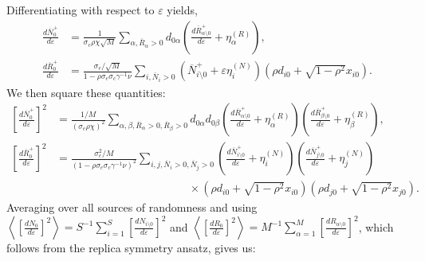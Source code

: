 \documentclass[10pt]{article}
\newcommand{\eval}[1]{\left\langle #1 \right\rangle}
\begin{document}
Differentiating with respect to $\varepsilon$ yields,
\begin{align}
	\frac{d\overline N_0^+}{d\varepsilon}
	&= 
	\frac{1}{ \sigma_e \rho \chi \sqrt{M}}
	\sum_{\alpha ,\overline R_\alpha>0} d_{0\alpha} \left(
		\frac{d\overline R_{\alpha \setminus 0}^+}{d\varepsilon}
		+
		\eta_{\alpha}^{(R)}
	\right),
	\\
	\frac{d\overline R_0^+}{d\varepsilon}
	&=
	\frac{{\sigma_e}/{\sqrt{M}}}{1
	-
	\rho \sigma_e \sigma_c \gamma^{-1} \nu }
	\sum_{i,\overline N_i>0}
	\left(
		\overline N_{i \setminus 0}^+
		+
		\varepsilon \eta_i^{(N)}
	\right)
	\left(
		\rho d_{i0}
		+
		\sqrt{1-\rho^2}x_{i0}
	\right).
\end{align}
We then square these quantities:
\begin{align}
	\left[\frac{d\overline N_0^+}{d\varepsilon}\right]^2
	&= 
	\frac{1/M}{ (\sigma_e \rho \chi)^2 }
	\sum_{\alpha,\beta ,\overline R_\alpha>0,\overline R_\beta>0}
	d_{0\alpha} 
	d_{0\beta} 
	\left(
		\frac{d\overline R_{\alpha \setminus 0}^+}{d\varepsilon}
		+
		\eta_{\alpha}^{(R)}
	\right)
	\left(
		\frac{d\overline R_{\beta \setminus 0}^+}{d\varepsilon}
		+
		\eta_{\beta}^{(R)}
	\right)
	,
	\\
	\left[
		\frac{d\overline R_0^+}{d\varepsilon}
	\right]^2
	&=
	\frac{\sigma_e^2/M}{
		(1
	-
	\rho \sigma_e \sigma_c \gamma^{-1} \nu)^2 }
	\sum_{i,j,\overline N_i>0,\overline N_j>0}
	\left(
		\frac{
			d\overline N_{i \setminus 0}^+
		}{d\varepsilon}
		+
		\eta_i^{(N)}
	\right)
	\left(
		\frac{
			d\overline N_{j \setminus 0}^+
		}{d\varepsilon}
		+
		\eta_j^{(N)}
	\right)
	\\
	\nonumber
	&\hspace{5cm}
	\times
	\left(
		\rho d_{i0}
		+
		\sqrt{1-\rho^2}x_{i0}
	\right)
	\left(
		\rho d_{j0}
		+
		\sqrt{1-\rho^2}x_{j0}
	\right)
	.
\end{align}
Averaging over all sources of randomness and using
$
\eval{\left[\frac{dN_{0}}{d\varepsilon}\right]^2}=S^{-1}\sum_{i=1}^S \left[\frac{dN_{i\setminus 0}}{d\varepsilon}\right]^2
$
and
$
\eval{\left[\frac{dR_{0}}{d\varepsilon}\right]^2}=M^{-1}\sum_{\alpha=1}^M \left[\frac{dR_{\alpha\setminus 0}}{d\varepsilon}\right]^2
$,
which follows from the replica symmetry ansatz, gives us:
\end{document}
